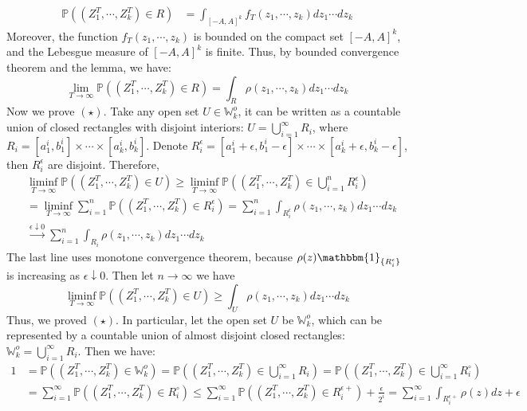 \documentclass[12pt]{article}
\begin{document}
\begin{align*}
\mathbb{P}((Z_{1}^{T},\cdots,Z_{k}^{T})\in R)&=\int_{[-A,A]^{k}}f_{T}(z_{1},\cdots,z_{k})dz_{1}\cdots dz_{k}
\end{align*}
Moreover, the function $f_{T}(z_{1},\cdots,z_{k})$ is bounded on the compact set $[-A,A]^{k}$, and the Lebesgue measure of $[-A,A]^{k}$ is finite. Thus, by bounded convergence theorem and the lemma, we have:
$$\lim_{T\rightarrow\infty}\mathbb{P}((Z_{1}^{T},\cdots,Z_{k}^{T})\in R)=\int_{R}\rho(z_{1},\cdots,z_{k})dz_{1}\cdots dz_{k}$$
Now we prove $(\star)$. Take any open set $U\in \mathbb{W}_{k}^{o}$, it can be written as a countable union of closed rectangles with disjoint interiors: $U=\bigcup_{i=1}^{\infty}R_{i}$, where $R_{i}=[a_{1}^{i},b_{1}^{i}]\times\cdots\times[a_{k}^{i},b_{k}^{i}]$. Denote $R_{i}^{\epsilon}=[a_{1}^{i}+\epsilon,b_{1}^{i}-\epsilon]\times\cdots\times[a_{k}^{i}+\epsilon,b_{k}^{i}-\epsilon]$, then $R_{i}^{\epsilon}$ are disjoint. Therefore,
\begin{align*}
	&\liminf_{T\rightarrow\infty}\mathbb{P}((Z_{1}^{T},\cdots,Z_{k}^{T})\in U)\geqslant\liminf_{T\rightarrow\infty}\mathbb{P}((Z_{1}^{T},\cdots,Z_{k}^{T})\in \bigcup_{i=1}^{n}R_{i}^{\epsilon})\\
	&=\liminf_{T\rightarrow\infty}\sum_{i=1}^{n}\mathbb{P}((Z_{1}^{T},\cdots,Z_{k}^{T})\in R_{i}^{\epsilon})=\sum_{i=1}^{n}\int_{R_{i}^{\epsilon}}\rho(z_1,\cdots,z_{k})dz_{1}\cdots dz_{k}\\
	&\xrightarrow{\epsilon\downarrow 0} \sum_{i=1}^{n}\int_{R_{i}}\rho(z_1,\cdots,z_{k})dz_{1}\cdots dz_{k}
\end{align*}
The last line uses monotone convergence theorem, because $\rho(z)\mathbbm{1}_{\{R_{i}^{\epsilon}\}}$ is increasing as $\epsilon\downarrow 0$. Then let $n\rightarrow\infty$ we have $$\liminf_{T\rightarrow\infty}\mathbb{P}((Z_{1}^{T},\cdots,Z_{k}^{T})\in U)\geqslant\int_{U}\rho(z_1,\cdots,z_{k})dz_{1}\cdots dz_{k}$$
Thus, we proved $(\star)$. In particular, let the open set $U$ be $\mathbb{W}_{k}^{o}$, which can be represented by a countable union of almost disjoint closed rectangles: $\mathbb{W}_{k}^{o}=\bigcup_{i=1}^{\infty}R_{i}$. Then we have:
\begin{align*}
	1&=\mathbb{P}((Z_{1}^{T},\cdots,Z_{k}^{T})\in \mathbb{W}_{k}^{o})=\mathbb{P}((Z_{1}^{T},\cdots,Z_{k}^{T})\in \bigcup_{i=1}^{\infty}R_{i})=\mathbb{P}((Z_{1}^{T},\cdots,Z_{k}^{T})\in\bigcup_{i=1}^{\infty}R_{i}^{\circ})\\
	&=\sum_{i=1}^{\infty}\mathbb{P}((Z_{1}^{T},\cdots,Z_{k}^{T})\in R_{i}^{\circ})\leqslant \sum_{i=1}^{\infty}\mathbb{P}((Z_{1}^{T},\cdots,Z_{k}^{T})\in R_{i}^{\epsilon+})+\frac{\epsilon}{2^{i}}=\sum_{i=1}^{\infty}\int_{R_{i}^{\epsilon+}}\rho(z)dz+\epsilon
\end{align*}
\end{document}
